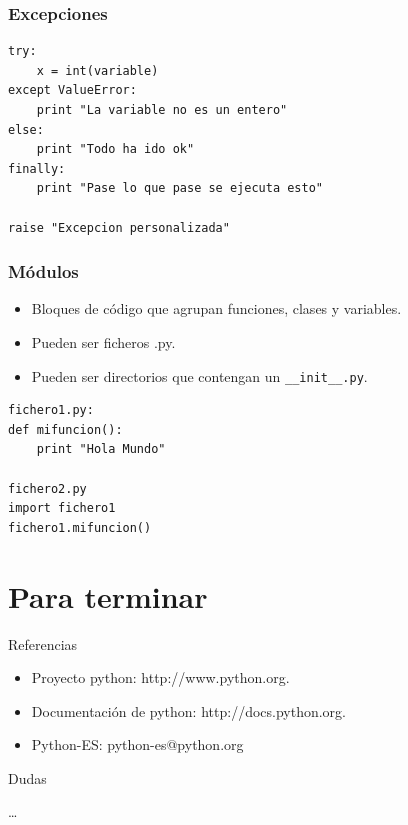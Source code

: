 \documentclass[10pt]{beamer}
\begin{document}
  \begin{frame}[containsverbatim]
    \frametitle{Excepciones}
    \begin{verbatim}
try:
    x = int(variable)
except ValueError:
    print "La variable no es un entero"
else:
    print "Todo ha ido ok"
finally:
    print "Pase lo que pase se ejecuta esto"

raise "Excepcion personalizada"
    \end{verbatim}
  \end{frame}

  \begin{frame}[containsverbatim]
    \frametitle{Módulos}
    \begin{itemize}
      \item Bloques de código que agrupan funciones, clases y variables.
      \item Pueden ser ficheros .py.
      \item Pueden ser directorios que contengan un \verb+__init__.py+.
    \end{itemize}
    \begin{verbatim}
fichero1.py:
def mifuncion():
    print "Hola Mundo"

fichero2.py
import fichero1
fichero1.mifuncion()
    \end{verbatim}
  \end{frame}

  \section*{Para terminar}
  
  \begin{frame}{Referencias}
    \begin{itemize}
      \item Proyecto python: http://www.python.org.
      \item Documentación de python: http://docs.python.org.
      \item Python-ES: python-es@python.org
    \end{itemize}
  \end{frame}

  \begin{frame}{Dudas}
    \begin{center}
      \dots
    \end{center}
  \end{frame}
\end{document}

